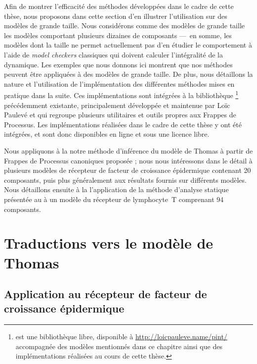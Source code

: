 Afin de montrer l'efficacité des méthodes développées dans le cadre de cette thèse,
nous proposons dans cette section d'en illustrer l'utilisation sur des modèles
de grande taille.
Nous considérons comme des modèles de grande taille les modèles comportant plusieurs
dizaines de composants
---~en somme, les modèles dont la taille ne permet actuellement pas d'en étudier
le comportement à l'aide de \textit{model checkers} classiques
qui doivent calculer l'intégralité de la dynamique.
Les exemples que nous donnons ici montrent que nos méthodes peuvent être
appliquées à des modèles de grande taille.
De plus, nous détaillons la nature et l'utilisation de l'implémentation
des différentes méthodes mises en pratique dans la suite.
Ces implémentations sont intégrées à la bibliothèque \Pint%
\footnote{\Pint{} est une bibliothèque libre, disponible à \url{http://loicpauleve.name/pint/}
accompagnée des modèles mentionnés dans ce chapitre
ainsi que des implémentations réalisées au cours de cette thèse.}
précédemment existante,
principalement développée et maintenue par Loïc Paulevé
et qui regroupe plusieurs utilitaires et outils propres aux Frappes de Processus.
Les implémentations réalisées dans le cadre de cette thèse y ont été intégrées,
et sont donc disponibles en ligne et sous une licence libre.

\myskip

Nous appliquons à la  notre méthode d'inférence
du modèle de Thomas à partir de Frappes de Processus canoniques proposée  ;
nous nous intéressons dans le détail à plusieurs modèles
de récepteur de facteur de croissance épidermique contenant 20 composants,
puis plus généralement aux résultats fournis sur différents modèles.
Nous détaillons ensuite à la  l'application de la méthode
d'analyse statique présentée
au  à un modèle du récepteur de lymphocyte~T comprenant 94 composants.




\section{Traductions vers le modèle de Thomas}


\subsection{Application au récepteur de facteur de croissance épidermique}

